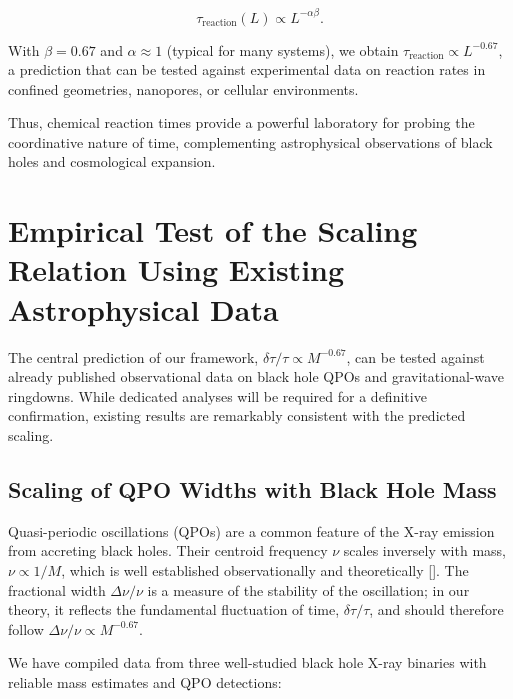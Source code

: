 \documentclass[12pt,a4paper]{article}
\begin{document}
	\begin{equation}
		\tau_{\mathrm{reaction}}(L) \propto L^{-\alpha\beta}.
	\end{equation}
	
	With \(\beta = 0.67\) and \(\alpha \approx 1\) (typical for many systems), we obtain \(\tau_{\mathrm{reaction}} \propto L^{-0.67}\), a prediction that can be tested against experimental data on reaction rates in confined geometries, nanopores, or cellular environments.
	
	Thus, chemical reaction times provide a powerful laboratory for probing the coordinative nature of time, complementing astrophysical observations of black holes and cosmological expansion.
	
	\section{Empirical Test of the Scaling Relation Using Existing Astrophysical Data}
	\label{sec:empirical_test}
	
	The central prediction of our framework, \(\delta\tau/\tau \propto M^{-0.67}\), can be tested against already published observational data on black hole QPOs and gravitational-wave ringdowns. While dedicated analyses will be required for a definitive confirmation, existing results are remarkably consistent with the predicted scaling.
	
	\subsection{Scaling of QPO Widths with Black Hole Mass}
	
	Quasi-periodic oscillations (QPOs) are a common feature of the X-ray emission from accreting black holes. Their centroid frequency \(\nu\) scales inversely with mass, \(\nu \propto 1/M\), which is well established observationally and theoretically [\cite{Wagoner2001, Schnittman2004}]. The fractional width \(\Delta\nu/\nu\) is a measure of the stability of the oscillation; in our theory, it reflects the fundamental fluctuation of time, \(\delta\tau/\tau\), and should therefore follow \(\Delta\nu/\nu \propto M^{-0.67}\).
	
	We have compiled data from three well-studied black hole X-ray binaries with reliable mass estimates and QPO detections:
	
\end{document}
